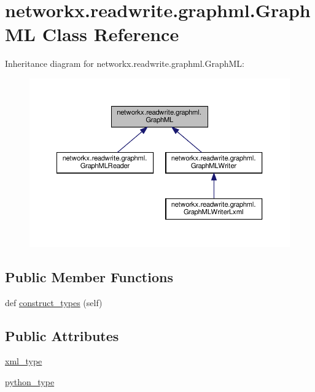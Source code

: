 \hypertarget{classnetworkx_1_1readwrite_1_1graphml_1_1GraphML}{}\section{networkx.\+readwrite.\+graphml.\+Graph\+ML Class Reference}
\label{classnetworkx_1_1readwrite_1_1graphml_1_1GraphML}


Inheritance diagram for networkx.\+readwrite.\+graphml.\+Graph\+ML\+:
\nopagebreak
\begin{figure}[H]
\begin{center}
\leavevmode
\includegraphics[width=350pt]{classnetworkx_1_1readwrite_1_1graphml_1_1GraphML__inherit__graph}
\end{center}
\end{figure}
\subsection*{Public Member Functions}
\begin{DoxyCompactItemize}
\item 
def \hyperlink{classnetworkx_1_1readwrite_1_1graphml_1_1GraphML_a25fb416e6fe21d1b5dfdbfbda4d7cb5a}{construct\+\_\+types} (self)
\end{DoxyCompactItemize}
\subsection*{Public Attributes}
\begin{DoxyCompactItemize}
\item 
\hyperlink{classnetworkx_1_1readwrite_1_1graphml_1_1GraphML_ac708a1275144bbbf6861d14e6a891680}{xml\+\_\+type}
\item 
\hyperlink{classnetworkx_1_1readwrite_1_1graphml_1_1GraphML_a6bb041a14660c70577b6d8e0d0738e4f}{python\+\_\+type}
\end{DoxyCompactItemize}
